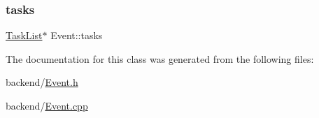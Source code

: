 \subsubsection{\texorpdfstring{tasks}{tasks}}
{\footnotesize\ttfamily \mbox{\hyperlink{class_task_list}{Task\+List}}$\ast$ Event\+::tasks}



The documentation for this class was generated from the following files\+:\begin{DoxyCompactItemize}
\item 
backend/\mbox{\hyperlink{_event_8h}{Event.\+h}}\item 
backend/\mbox{\hyperlink{_event_8cpp}{Event.\+cpp}}\end{DoxyCompactItemize}
